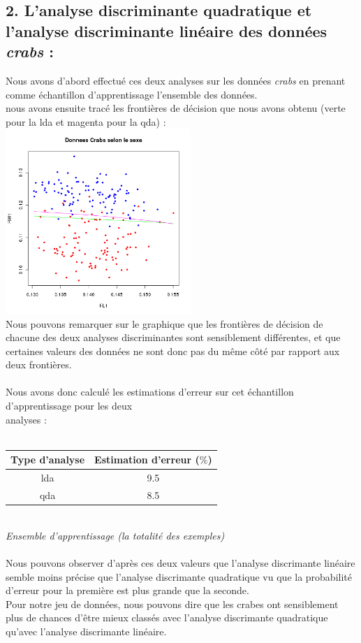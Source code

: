 \documentclass[a4paper, 10pt]{article}
\begin{document}
\newpage
\subsection*{2. L'analyse discriminante quadratique et l'analyse discriminante linéaire des données \textit{crabs} :}
Nous avons d'abord effectué ces deux analyses sur les données \textit{crabs} en prenant comme échantillon d'apprentissage l'ensemble des données.\\
nous avons ensuite tracé les frontières de décision que nous avons obtenu (verte pour la lda et magenta pour la qda) :\\
\includegraphics[height = 7cm, width = 7cm]{plots/exo2_analyse1.png}\\
Nous pouvons remarquer sur le graphique que les frontières de décision de chacune des deux analyses discriminantes sont sensiblement différentes,
et que certaines valeurs des données ne sont donc pas du même côté par rapport aux deux frontières.\\ \\
Nous avons donc calculé les estimations d'erreur sur cet échantillon d'apprentissage pour les deux\\analyses :\\ \\
\begin{tabular}{|c|c|}
\hline
Type d'analyse & Estimation d'erreur ($\%$) \\
\hline
lda & 9.5 \\
\hline
qda & 8.5\\
\hline
\end{tabular}\\
\textit{Ensemble d'apprentissage (la totalité des exemples)}\\ \\
Nous pouvons observer d'après ces deux valeurs que l'analyse discrimante linéaire semble moins précise que l'analyse discrimante quadratique
vu que la probabilité d'erreur pour la première est plus grande que la seconde.\\
Pour notre jeu de données, nous pouvons dire que les crabes ont sensiblement plus de chances d'être mieux classés avec l'analyse discrimante
quadratique qu'avec l'analyse discrimante linéaire.
\end{document}
